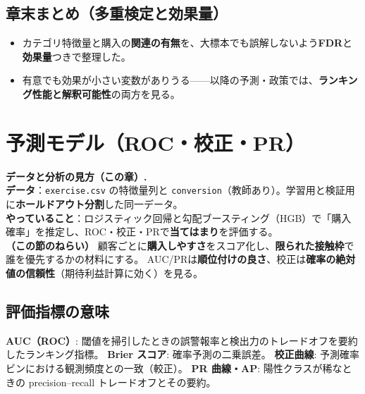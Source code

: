\documentclass[11pt,a4paper]{article}
\begin{document}
\subsection*{章末まとめ（多重検定と効果量）}
\begin{itemize}\setlength{\itemsep}{0.2em}
  \item カテゴリ特徴量と購入の\textbf{関連の有無}を、大標本でも誤解しないよう\textbf{FDR}と\textbf{効果量}つきで整理した。
  \item 有意でも効果が小さい変数がありうる——以降の予測・政策では、\textbf{ランキング性能と解釈可能性}の両方を見る。
\end{itemize}

\newpage
\FloatBarrier


\FloatBarrier
\section{予測モデル（ROC・校正・PR）}
\label{sec:pred}

\noindent\textbf{データと分析の見方（この章）.}\\
\textbf{データ}：\texttt{exercise.csv} の特徴量列と \texttt{conversion}（教師あり）。学習用と検証用に\textbf{ホールドアウト分割}した同一データ。\\
\textbf{やっていること}：ロジスティック回帰と勾配ブースティング（HGB）で「購入確率」を推定し、ROC・校正・PRで\textbf{当てはまり}を評価する。\\

\noindent\textbf{（この節のねらい）}
顧客ごとに\textbf{購入しやすさ}をスコア化し、\textbf{限られた接触枠}で誰を優先するかの材料にする。
AUC/PRは\textbf{順位付けの良さ}、校正は\textbf{確率の絶対値の信頼性}（期待利益計算に効く）を見る。

\subsection{評価指標の意味}
\textbf{AUC（ROC）}: 閾値を掃引したときの誤警報率と検出力のトレードオフを要約したランキング指標。
\textbf{Brier スコア}: 確率予測の二乗誤差。
\textbf{校正曲線}: 予測確率ビンにおける観測頻度との一致（較正）。
\textbf{PR 曲線・AP}: 陽性クラスが稀なときの precision--recall トレードオフとその要約。
\end{document}
